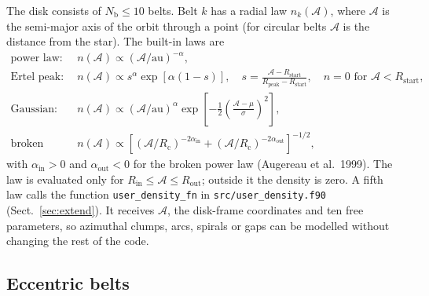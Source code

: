 \documentclass[11pt,a4paper]{article}
\newcommand{\code}[1]{\texttt{#1}}
\begin{document}
The disk consists of $N_\mathrm{b}\le 10$ belts. Belt $k$ has a radial law $n_k(\mathcal{A})$,
where $\mathcal{A}$ is the semi-major axis of the orbit through a point (for circular belts
$\mathcal{A}$ is the distance from the star). The built-in laws are
\begin{align}
\text{power law:}\quad & n(\mathcal{A}) \propto (\mathcal{A}/\mathrm{au})^{-\alpha},
  \label{eq:pl}\\
\text{Ertel peak:}\quad & n(\mathcal{A}) \propto s^{\alpha}\exp[\alpha(1-s)],\quad
  s = \frac{\mathcal{A}-R_\mathrm{start}}{R_\mathrm{peak}-R_\mathrm{start}},\quad
  n = 0 \text{ for } \mathcal{A}<R_\mathrm{start},\\
\text{Gaussian:}\quad & n(\mathcal{A}) \propto (\mathcal{A}/\mathrm{au})^{\alpha}
  \exp\!\left[-\tfrac{1}{2}\left(\tfrac{\mathcal{A}-\mu}{\sigma}\right)^2\right],\\
\text{broken power law:}\quad & n(\mathcal{A}) \propto
  \left[(\mathcal{A}/R_\mathrm{c})^{-2\alpha_\mathrm{in}} +
        (\mathcal{A}/R_\mathrm{c})^{-2\alpha_\mathrm{out}}\right]^{-1/2},
  \label{eq:broken}
\end{align}
with $\alpha_\mathrm{in}>0$ and $\alpha_\mathrm{out}<0$ for the broken power law (Augereau et
al.\ 1999). The law is evaluated only for $R_\mathrm{in}\le\mathcal{A}\le R_\mathrm{out}$; outside
it the density is zero. A fifth law calls the function \code{user\_density\_fn} in
\code{src/user\_density.f90} (Sect.~\ref{sec:extend}). It receives $\mathcal{A}$, the disk-frame
coordinates and ten free parameters, so azimuthal clumps, arcs, spirals or gaps can be modelled
without changing the rest of the code.

\subsection{Eccentric belts}
\label{sec:ecc}
\end{document}
